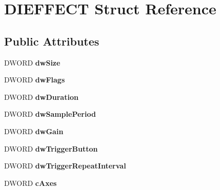 \hypertarget{struct_d_i_e_f_f_e_c_t}{\section{D\-I\-E\-F\-F\-E\-C\-T Struct Reference}
\label{struct_d_i_e_f_f_e_c_t}
}
\subsection*{Public Attributes}
\begin{DoxyCompactItemize}
\item 
\hypertarget{struct_d_i_e_f_f_e_c_t_a68d18ada8d43539e914e920bac27c984}{D\-W\-O\-R\-D {\bfseries dw\-Size}}\label{struct_d_i_e_f_f_e_c_t_a68d18ada8d43539e914e920bac27c984}

\item 
\hypertarget{struct_d_i_e_f_f_e_c_t_a5f2d4058dad3d3e6ef6bf546bb037c2c}{D\-W\-O\-R\-D {\bfseries dw\-Flags}}\label{struct_d_i_e_f_f_e_c_t_a5f2d4058dad3d3e6ef6bf546bb037c2c}

\item 
\hypertarget{struct_d_i_e_f_f_e_c_t_a2e8a7e3dbf7f30ade92c1c07c35d3c19}{D\-W\-O\-R\-D {\bfseries dw\-Duration}}\label{struct_d_i_e_f_f_e_c_t_a2e8a7e3dbf7f30ade92c1c07c35d3c19}

\item 
\hypertarget{struct_d_i_e_f_f_e_c_t_ad145c3ac19a4086fdc397a0226eea5b1}{D\-W\-O\-R\-D {\bfseries dw\-Sample\-Period}}\label{struct_d_i_e_f_f_e_c_t_ad145c3ac19a4086fdc397a0226eea5b1}

\item 
\hypertarget{struct_d_i_e_f_f_e_c_t_a32a100619fcd374b63f6ab70d9b72eb6}{D\-W\-O\-R\-D {\bfseries dw\-Gain}}\label{struct_d_i_e_f_f_e_c_t_a32a100619fcd374b63f6ab70d9b72eb6}

\item 
\hypertarget{struct_d_i_e_f_f_e_c_t_a1283ada33ce85bfdb25af7eff8154d8d}{D\-W\-O\-R\-D {\bfseries dw\-Trigger\-Button}}\label{struct_d_i_e_f_f_e_c_t_a1283ada33ce85bfdb25af7eff8154d8d}

\item 
\hypertarget{struct_d_i_e_f_f_e_c_t_a616457fa90119a184cb4800ea1a21816}{D\-W\-O\-R\-D {\bfseries dw\-Trigger\-Repeat\-Interval}}\label{struct_d_i_e_f_f_e_c_t_a616457fa90119a184cb4800ea1a21816}

\item 
\hypertarget{struct_d_i_e_f_f_e_c_t_a0b663ab30264a07c2a6dea7599fd324f}{D\-W\-O\-R\-D {\bfseries c\-Axes}}\label{struct_d_i_e_f_f_e_c_t_a0b663ab30264a07c2a6dea7599fd324f}


\end{DoxyCompactItemize}
